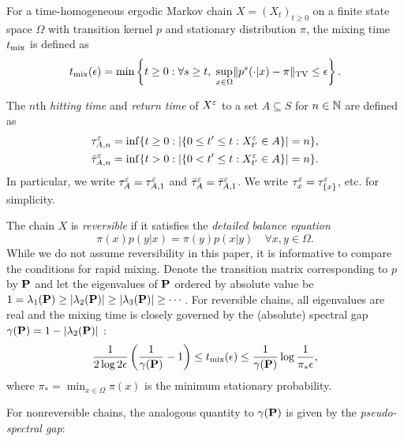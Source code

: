 \begin{defn}
For a time-homogeneous ergodic Markov chain $X=(X_t)_{t\ge 0}$ on a finite state space $\Omega$ with transition kernel $p$ and stationary distribution $\pi$, the mixing time $t_{\operatorname{mix}}$ is defined as
\begin{equation*}
t_{\operatorname{mix}}(\epsilon) = \min\left\{t\ge 0: \forall s\ge t,\; \sup_{x\in\Omega}\lVert p^s(\cdot|x) - \pi\rVert_{\operatorname{TV}} \le\epsilon \right\}.
\end{equation*}
\end{defn}

\begin{defn}
The $n$th \emph{hitting time} and \emph{return time} of $X^\varepsilon$ to a set $A\subseteq S$ for $n\in\mathbb{N}$ are defined as
\begin{align*}
\tau_{A,n}^\varepsilon &= \inf\{t\ge 0:\left\lvert\{0\le t'\le t: X_{t'}^\varepsilon\in A\}\right\rvert=n\},\\
\bar{\tau}_{A,n}^\varepsilon &= \inf\{t> 0:\left\lvert\{0<t'\le t: X_{t'}^\varepsilon\in A\}\right\rvert=n\}.
\end{align*}
In particular, we write $\tau_A^\varepsilon = \tau_{A,1}^\varepsilon$ and $\bar{\tau}_A^\varepsilon = \bar{\tau}_{A,1}^\varepsilon$. We write $\tau_x^\varepsilon=\tau_{\{x\}}^\varepsilon$, etc. for simplicity.
\end{defn}

The chain $X$ is \emph{reversible} if it satisfies the \emph{detailed balance equation}
\begin{equation*}
\pi(x) p(y|x) = \pi(y) p(x|y) \quad\forall x,y\in\Omega.
\end{equation*}
While we do not assume reversibility in this paper, it is informative to compare the conditions for rapid mixing. Denote the transition matrix corresponding to $p$ by $\mathbf{P}$ and let the eigenvalues of $\mathbf{P}$ ordered by absolute value be $1=\lambda_1(\mathbf{P})\ge |\lambda_2(\mathbf{P})|\ge |\lambda_3(\mathbf{P})|\ge\cdots$. For reversible chains, all eigenvalues are real and the mixing time is closely governed by the (absolute) spectral gap $\gamma(\mathbf{P}) = 1-|\lambda_2(\mathbf{P})|$ \citep{Levin09}:
\begin{equation*}
\frac{1}{2\log 2\epsilon} \left(\frac{1}{\gamma(\mathbf{P})}-1\right) \le t_{\operatorname{mix}}(\epsilon) \le \frac{1}{\gamma(\mathbf{P})} \log\frac{1}{\pi_*\epsilon},
\end{equation*}
where $\pi_* = \min_{x\in\Omega}\pi(x)$ is the minimum stationary probability.

For nonreversible chains, the analogous quantity to $\gamma(\mathbf{P})$ is given by the \emph{pseudo-spectral gap}:

